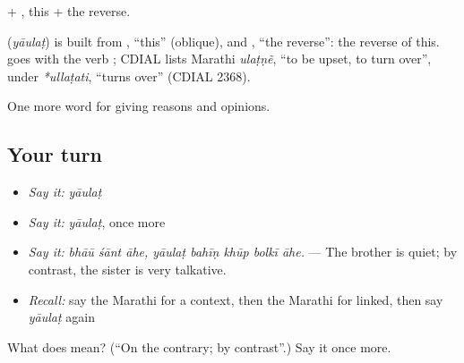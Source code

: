  + , this + the reverse.

\begin{cousinweb}
\textbf{} (\emph{yāulaṭ}) is built from , \textquotedblleft{}this\textquotedblright{} (oblique), and , \textquotedblleft{}the reverse\textquotedblright{}: the reverse of this.  goes with the verb ; CDIAL lists Marathi \emph{ulaṭṇẽ}, \textquotedblleft{}to be upset, to turn over\textquotedblright{}, under \emph{*ullaṭati}, \textquotedblleft{}turns over\textquotedblright{} (CDIAL 2368).
\end{cousinweb}

\begin{grammarlens}[title={What you've built}]
One more word for giving reasons and opinions.
\end{grammarlens}

\subsection*{Your turn}
\begin{itemize}
\raggedright
  \item \emph{Say it:} \emph{yāulaṭ}
  \item \emph{Say it:} \emph{yāulaṭ}, once more
  \item \emph{Say it:} \emph{bhāū śānt āhe, yāulaṭ bahīṇ khūp bolkī āhe.} — The brother is quiet; by contrast, the sister is very talkative.
  \item \emph{Recall:} say the Marathi for a context, then the Marathi for linked, then say \emph{yāulaṭ} again
\end{itemize}

\begin{tcolorbox}[breakable,colback=teal!4,colframe=teal!35!black,title={Before you move on}]
What does  mean? (\textquotedblleft{}On the contrary; by contrast\textquotedblright{}.) Say it once more.
\end{tcolorbox}
